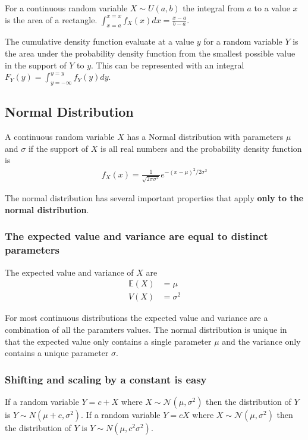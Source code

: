 \ex For a continuous random variable $X \sim U(a,b)$ the integral from $a$ to a value $x$ is the area of a rectangle. 
$\int_{x=a}^{x=x} f_{X}(x) dx = \frac{x-a}{b-a}$.

\ex The cumulative density function evaluate at a value $y$ for a random variable $Y$ is the area under the probability density function from the smallest possible value in the support of $Y$ to $y$. This can be represented with an integral $F_{Y}(y) = \int_{y=-\infty}^{y=y} f_{Y}(y) dy$. 

\subsection{Normal Distribution}

A continuous random variable $X$ has a Normal distribution with parameters $\mu$ and $\sigma$ if the support of $X$ is all real numbers and the probability density function is 
\begin{align}
    f_{X}(x) = \frac{1}{\sqrt{2 \pi \sigma^{2}}} e^{ - (x - \mu)^{2} / 2\sigma^{2}  }
\end{align}

The normal distribution has several important properties that apply \textbf{only to the normal distribution}. 

\subsubsection{The expected value and variance are equal to distinct parameters}

The expected value and variance of $X$ are 
\begin{align}
    \mathbb{E}(X) &= \mu\\
             V(X) &= \sigma^{2} 
\end{align}

For most continuous distributions the expected value and variance are a combination of all the paramters values. The normal distribution is unique in that the expected value only contains a single parameter $\mu$ and the variance only contains a unique parameter $\sigma$.

\subsubsection{Shifting and scaling by a constant is easy}

If a random variable $Y = c + X$ where $X \sim \mathcal{N}(\mu,\sigma^{2})$ then the distribution of $Y$ is $Y \sim N(\mu + c, \sigma^{2})$.
%
If a random variable $Y = cX$ where $X \sim \mathcal{N}(\mu,\sigma^{2})$ then the distribution of $Y$ is $Y \sim N(\mu, c^{2}\sigma^{2})$.

